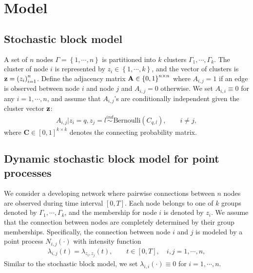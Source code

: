
\section{Model} \label{sec:model}


\subsection{Stochastic block model} %

A set of $n$ nodes $\Gamma=\left\{ 1,\cdots,n \right\}$ is partitioned into $k$ clusters $\Gamma_1,\cdots,\Gamma_k$. 
The cluster of node $i$ is represented by $z_i\in \left\{ 1,\cdots,k \right\}$, and the vector of clusters is $\mathbf{z}=\left( z_i \right)_{i=1}^n $. 
Define the adjacency matrix $\mathbf{A}\in \left\{ 0,1\right\}^{n\times n}$ where  $A_{i,j}= 1$ if an edge is observed between node $i$ and node $j$ and $A_{i,j}=0$ otherwise.
We set ${A}_{i,i}\equiv 0$  for any $i=1,\cdots,n$, 
and assume that $A_{i,j}$'s are conditionally independent given the cluster vector $\mathbf{z}$:
\begin{align*}
{A}_{i,j}|z_i=q,z_j=l \overset{ind}{\sim} \text{Bernoulli}({C}_{q,l}), \qquad i\neq j,
\end{align*}
where $\mathbf{C}\in [0,1]^{k\times k}$ denotes the  connecting probability matrix.




\subsection{Dynamic stochastic block model for point processes}



We consider a developing network where pairwise connections between $n$ nodes are observed during time interval $[0,T]$.
Each node belongs to one of $k$ groups denoted by $\Gamma_1, \cdots, \Gamma_k$, and the membership for node $i$ is denoted by $z_i$.
We assume that the connection between nodes are completely determined by their group memberships.
Specifically, the connection between node $i$ and $j$ is modeled by a point process $N_{i,j}(\cdot)$ with intensity function
\begin{align*}
\lambda_{i,j}(t) = \lambda_{z_i,z_j}(t), 
\qquad t\in[0,T],\quad i,j=1,\cdots,n, 
\end{align*}
Similar to the stochastic block model, we set $\lambda_{i,i}(\cdot)\equiv 0$ for $i=1,\cdots,n$.


